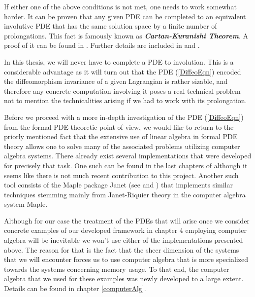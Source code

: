 If either one of the above conditions is not met, one needs to work somewhat harder. It can be proven that any given PDE can be completed to an equivalent involutive PDE that has the same solution space by a finite number of prolongations. This fact is famously known as \textbf{\textit{Cartan-Kuranishi Theorem}}. A proof of it can be found in \cite{sweeney1968}. Further details are included in \cite{seiler2009involution} and \cite{seiler1994analysis}.

In this thesis, we will never have to complete a PDE to involution. This is a considerable advantage as it will turn out that the PDE (\ref{DiffeoEqn}) encoded the diffeomorphism invariance of a given Lagrangian is rather sizable, and therefore any concrete computation involving it poses a real technical problem not to mention the technicalities arising if we had to work with its prolongation. 

Before we proceed with a more in-depth investigation of the PDE (\ref{DiffeoEqn}) from the formal PDE theoretic point of view, we would like to return to the priorly mentioned fact that the extensive use of linear algebra in formal PDE theory allows one to solve many of the associated problems utilizing computer algebra systems. There already exist several implementations that were developed for precisely that task. One such can be found in the last chapters of \cite{seiler1994analysis} although it seems like there is not much recent contribution to this project. Another such tool consists of the Maple package Janet (see \cite{Janet2} and \cite{Janet}) that implements similar techniques stemming mainly from Janet-Riquier theory in the computer algebra system Maple. 

Although for our case the treatment of the PDEs that will arise once we consider concrete examples of our developed framework in chapter 4 employing computer algebra will be inevitable we won't use either of the implementations presented above. The reason for that is the fact that the sheer dimension of the systems that we will encounter forces us to use computer algebra that is more specialized towards the systems concerning memory usage. To that end, the computer algebra that we used for these examples was newly developed to a large extent. Details can be found in chapter \ref{computerAlg}.    

